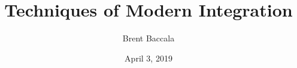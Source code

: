 \documentclass[aspectratio=169,dvipsnames]{beamer}
\title{Techniques of Modern Integration}
\author{Brent Baccala}
\institute{\tt cosine@freesoft.org}
\date{April 3, 2019}
\begin{document}
\newtheorem{idea}{Idea}


\newcommand{\sageinputcode}{}
\newcommand{\sageoutputmath}[1]{#1}


\newcommand{\ZZ}{\Bold{Z}}
\newcommand{\NN}{\Bold{N}}
\newcommand{\RR}{\Bold{R}}
\newcommand{\CC}{\mathbb{C}}
\newcommand{\QQ}{\Bold{Q}}
\newcommand{\QQbar}{\overline{\QQ}}
\newcommand{\GF}[1]{\Bold{F}_{#1}}
\newcommand{\Zp}[1]{\ZZ_{#1}}
\newcommand{\Qp}[1]{\QQ_{#1}}
\newcommand{\Zmod}[1]{\ZZ/#1\ZZ}
\newcommand{\CDF}{\Bold{C}}
\newcommand{\CIF}{\Bold{C}}
\newcommand{\CLF}{\Bold{C}}
\newcommand{\RDF}{\Bold{R}}
\newcommand{\RIF}{\Bold{I} \Bold{R}}
\newcommand{\RLF}{\Bold{R}}
\newcommand{\CFF}{\Bold{CFF}}
\newcommand{\Bold}[1]{\mathbf{#1}}


\renewenvironment{sageblock}{\renewcommand{\sageoutputmath}[1]{}\setpythontexautoprint{false}\sagecode}{\setpythontexautoprint{true}\endsagecode


%

\definecolor{mytextcolor}{rgb}{0,0,0}

\def\sageinputcodebreak{}
\renewcommand{\sageinputcode}{
\sageinputcodebreak
\bgroup
\def\arraystretch{1.5}
\begin{tabular}{L{1cm} L{10cm}}
\textcolor{blue}{\ttfamily sage:} &
\textcolor{mytextcolor}{\BUseVerbatim[baseline=t]{SageCode}}
\end{tabular}
\egroup
\def\sageinputcodebreak{\break}
}

\renewcommand{\sageoutputmath}[1]{
\def\sageinputcodebreak{}
\setlength\abovedisplayskip{0pt}
\setlength\belowdisplayskip{0pt}
\setlength\abovedisplayshortskip{0pt}
\setlength\belowdisplayshortskip{0pt}
\begin{dmath*}
##1
\end{dmath*}
}

\begin{mdframed}[backgroundcolor=yellow!20]
\tiny
\printpythontex
\end{mdframed}
}
\end{document}
